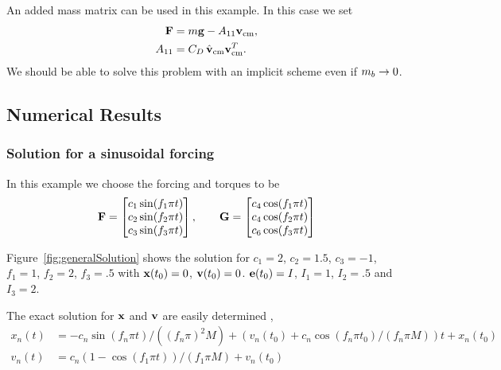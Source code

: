 An added mass matrix can be used in this example. In this case we
set
\begin{align*}
  \mathbf{ F} &= m \mathbf{ g} - A_{11}\mathbf{ v}_{\rm cm}  ,\\
  A_{11} & = C_D\, \hat{\mathbf{ v}}_{\rm cm}\mathbf{ v}_{\rm cm}^T .
\end{align*}
We should be able to solve this problem with an implicit scheme  even if $m_{b}\rightarrow 0$.

\subsection{Numerical Results}



\subsubsection{Solution for a sinusoidal forcing}


In this example we choose the forcing and torques to be 
\[
  \mathbf{ F} = \begin{bmatrix}  
     c_1 \sin( f_1\pi t) \\
     c_2 \sin( f_2\pi t) \\
     c_3 \sin( f_3\pi t)    
    \end{bmatrix}  
   ,\qquad
  \mathbf{ G} = \begin{bmatrix}
    c_4 \cos( f_1\pi t) \\ 
    c_4 \cos( f_2\pi t) \\ 
    c_6 \cos( f_3\pi t)    
  \end{bmatrix} 
\]


Figure~\ref{fig:generalSolution} shows the solution for $c_1=2$, $c_2=1.5$, $c_3=-1$,
$f_1=1$, $f_2=2$, $f_3=.5$ with $\mathbf{ x}(t_0)=0$, $\mathbf{ v}(t_0)=0$. 
$\mathbf{ e}(t_0)=I$, $I_1=1$, $I_2=.5$ and $I_3=2$. 



The exact solution for $\mathbf{ x}$ and $\mathbf{ v}$ are easily determined ,
\begin{align*}
    x_n(t) &= -c_n \sin( f_n\pi t)/((f_n\pi)^2 M)
                    + (v_n(t_0) + c_n \cos( f_n\pi t_0)/(f_n\pi M) ) t + x_n(t_0) \\
    v_n(t) &= c_n (1-\cos(f_1\pi t))/(f_1\pi M)  + v_n(t_0)
\end{align*}

